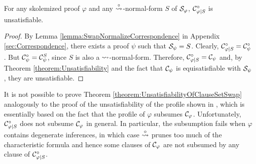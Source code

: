 \begin{theorem}
\label{theorem:UnsatisfiabilityOfClauseSetSwap}
For any skolemized proof $\varphi$ and any $\stackrel{\circ}{\leadsto}$-normal-form $S$ of $\mathcal{S}_{\varphi}$, $\mathcal{C}^{\circ}_{\varphi|S}$ is unsatisfiable.
\end{theorem}
\begin{proof}
By Lemma \ref{lemma:SwapNormalizeCorrespondence} in Appendix \ref{sec:Correspondence}, there exists a proof $\psi$ such that $\mathcal{S}_{\psi} = S$. Clearly, $\mathcal{C}^{\circ}_{\varphi|S} = \mathcal{C}^{\circ}_{\psi}$. But $\mathcal{C}^{\circ}_{\psi} = \mathcal{C}^S_{\psi}$, since $S$ is also a $\leadsto$-normal-form. Therefore, $\mathcal{C}^{\circ}_{\varphi|S} = \mathcal{C}_{\psi}$ and, by Theorem \ref{theorem:Unsatisfiability} and the fact that $\mathcal{C}_{\psi}$ is equisatisfiable with $\mathcal{S}_{\psi}$, they are unsatisfiable.
\end{proof}


\begin{remark}
It is not possible to prove Theorem \ref{theorem:UnsatisfiabilityOfClauseSetSwap} analogously to the proof of the unsatisfiability of the profile shown in \cite{Hetzl2007CharacteristicClauseSetsandProofTransformations,Hetzl2008ProofProfiles.CharacteristicClauseSetsandProofTransformations}, which is essentially based on the fact that the profile of $\varphi$ subsumes $\mathcal{C}_{\varphi}$. Unfortunately, $\mathcal{C}^{\circ}_{\varphi|S}$ does not subsume $\mathcal{C}_{\varphi}$ in general. In particular, the subsumption fails when $\varphi$ contains degenerate inferences, in which case $\stackrel{\circ}{\leadsto}$ prunes too much of the characteristic formula and hence some clauses of $\mathcal{C}_{\varphi}$ are not subsumed by any clause of $\mathcal{C}^{\circ}_{\varphi|S}$.
\end{remark}
